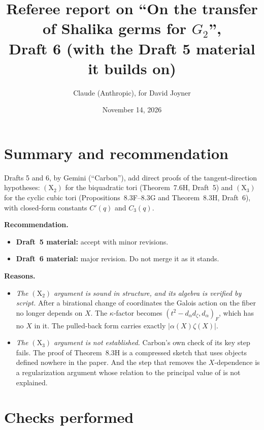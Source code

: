 \documentclass[12pt,letterpaper]{article}
\title{Referee report on ``On the transfer of Shalika germs for $G_2$'',\\
Draft 6 (with the Draft 5 material it builds on)}
\author{Claude (Anthropic), for David Joyner}
\date{November 14, 2026}
\begin{document}
\maketitle

\section*{Summary and recommendation}

Drafts 5 and 6, by Gemini (``Carbon''), add direct proofs of the
tangent-direction hypotheses: $(\mathrm X_2)$ for the biquadratic tori
(Theorem~7.6H, Draft~5) and $(\mathrm X_3)$ for the cyclic cubic tori
(Propositions~8.3F--8.3G and Theorem~8.3H, Draft~6), with closed-form
constants $C'(q)$ and $C_3(q)$.

\textbf{Recommendation.}
\begin{itemize}[leftmargin=1.5em]
\item \textbf{Draft~5 material:} accept with minor revisions.
\item \textbf{Draft~6 material:} major revision. Do not merge it as it
stands.
\end{itemize}

\textbf{Reasons.}
\begin{itemize}[leftmargin=1.5em]
\item \emph{The $(\mathrm X_2)$ argument is sound in structure, and its
algebra is verified by script.} After a birational change of coordinates the
Galois action on the fiber no longer depends on $X$. The $\kappa$-factor
becomes $(t^2-d_\alpha d_\zeta,d_\alpha)_F$, which has no $X$ in it. The
pulled-back form carries exactly $|\alpha(X)\zeta(X)|$.
\item \emph{The $(\mathrm X_3)$ argument is not established.} Carbon's own
check of its key step fails. The proof of Theorem~8.3H is a compressed sketch
that uses objects defined nowhere in the paper. And the step that removes the
$X$-dependence is a regularization argument whose relation to the principal
value of \cite{LS83} is not explained.
\end{itemize}

\section*{Checks performed}
\end{document}
